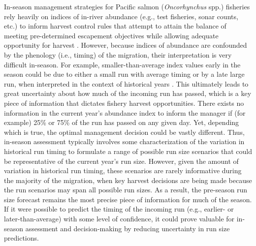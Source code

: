 \documentclass[12pt,]{book}
\theoremstyle{definition}
\theoremstyle{definition}
\theoremstyle{definition}
\theoremstyle{remark}
\begin{document}
\noindent
In-season management strategies for Pacific salmon (\emph{Oncorhynchus}
spp.) fisheries rely heavily on indices of in-river abundance (e.g.,
test fisheries, sonar counts, etc.) to inform harvest control rules that
attempt to attain the balance of meeting pre-determined escapement
objectives while allowing adequate opportunity for harvest
\citep{catalano-jones-2014}. However, because indices of abundance are
confounded by the phenology (i.e., timing) of the migration, their
interpretation is very difficult in-season. For example,
smaller-than-average index values early in the season could be due to
either a small run with average timing or by a late large run, when
interpreted in the context of historical years
\citep{adkison-cunningham-2015}. This ultimately leads to great
uncertainty about how much of the incoming run has passed, which is a
key piece of information that dictates fishery harvest opportunities.
There exists no information in the current year's abundance index to
inform the manager if (for example) 25\% or 75\% of the run has passed
on any given day. Yet, depending which is true, the optimal management
decision could be vastly different. Thus, in-season assessment typically
involves some characterization of the variation in historical run timing
to formulate a range of possible run size scenarios that could be
representative of the current year's run size. However, given the amount
of variation in historical run timing, these scenarios are rarely
informative during the majority of the migration, when key harvest
decisions are being made because the run scenarios may span all possible
run sizes. As a result, the pre-season run size forecast remains the
most precise piece of information for much of the season. If it were
possible to predict the timing of the incoming run (e.g., earlier- or
later-than-average) with some level of confidence, it could prove
valuable for in-season assessment and decision-making by reducing
uncertainty in run size predictions.
\end{document}
